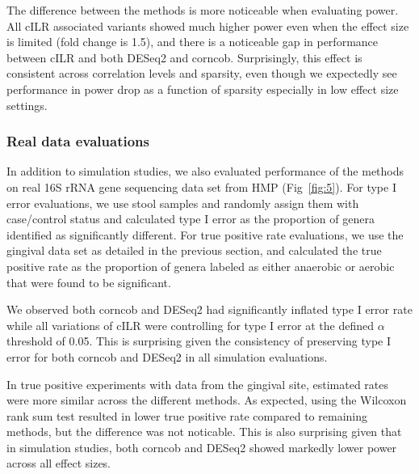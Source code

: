 \documentclass[10pt,letterpaper]{article}
\begin{document}
The difference between the methods is more noticeable when evaluating power. All cILR associated variants showed much higher power even when the effect size is limited (fold change is 1.5), and there is a noticeable gap in performance between cILR and both DESeq2 and corncob. Surprisingly, this effect is consistent across correlation levels and sparsity, even though we expectedly see performance in power drop as a function of sparsity especially in low effect size settings.  

\subsubsection*{Real data evaluations}
In addition to simulation studies, we also evaluated performance of the methods on real 16S rRNA gene sequencing data set from HMP (Fig~\ref{fig:5}). For type I error evaluations, we use stool samples and randomly assign them with case/control status and calculated type I error as the proportion of genera identified as significantly different. For true positive rate evaluations, we use the gingival data set as detailed in the previous section, and calculated the true positive rate as the proportion of genera labeled as either anaerobic or aerobic that were found to be significant.   

We observed both corncob and DESeq2 had significantly inflated type I error rate while all variations of cILR were controlling for type I error at the defined $\alpha$ threshold of 0.05. This is surprising given the consistency of preserving type I error for both corncob and DESeq2 in all simulation evaluations. 

In true positive experiments with data from the gingival site, estimated rates were more similar across the different methods. As expected, using the Wilcoxon rank sum test resulted in lower true positive rate compared to remaining methods, but the difference was not noticable. This is also surprising given that in simulation studies, both corncob and DESeq2 showed markedly lower power across all effect sizes.  
\end{document}
